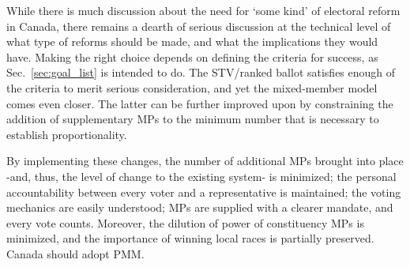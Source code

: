 \documentclass[DIV=calc, paper=a4, fontsize=11pt, twocolumn]{scrartcl}	 %
\begin{document}
While there is much discussion about the need for `some kind' of electoral reform in Canada, there remains a dearth of serious discussion at the technical level of what type of reforms should be made, and what the implications they would have. 
Making the right choice depends on defining the criteria for success, as Sec.~\ref{sec:goal_list} is intended to do.  
The STV/ranked ballot satisfies enough of the criteria to merit serious consideration, and yet the mixed-member model comes even closer. 
The latter can be further improved upon by constraining the addition of supplementary MPs to the minimum number that is necessary to establish proportionality.

By implementing these changes, the number of additional MPs brought into place \--and, thus, the level of change to the existing system\-- is minimized; the  personal accountability between every voter and a representative is maintained; the voting mechanics are easily understood; MPs are supplied with a clearer mandate, and every vote counts. 
Moreover, the dilution of power of constituency MPs is minimized, and the importance of winning local races is partially preserved.
Canada should adopt PMM. 

\end{document}
